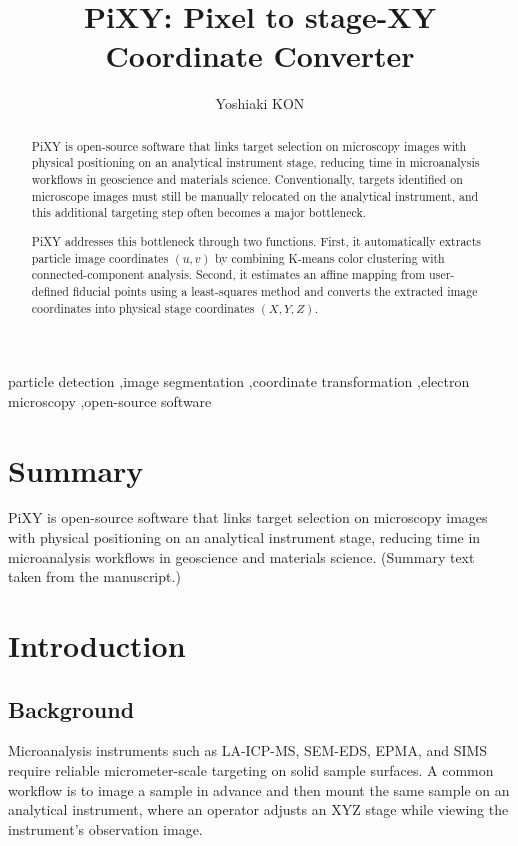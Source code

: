 \documentclass[preprint,12pt]{elsarticle}
\begin{document}
\begin{frontmatter}
\title{PiXY: Pixel to stage-XY Coordinate Converter}

\author[inst1]{Yoshiaki KON}
\address[inst1]{Geological Survey of Japan (GSJ), National Institute of Advanced Industrial Science and Technology (AIST)}

\begin{abstract}
PiXY is open-source software that links target selection on microscopy images with physical positioning on an analytical instrument stage, reducing time in microanalysis workflows in geoscience and materials science. Conventionally, targets identified on microscope images must still be manually relocated on the analytical instrument, and this additional targeting step often becomes a major bottleneck.

PiXY addresses this bottleneck through two functions. First, it automatically extracts particle image coordinates $(u, v)$ by combining K-means color clustering with connected-component analysis. Second, it estimates an affine mapping from user-defined fiducial points using a least-squares method and converts the extracted image coordinates into physical stage coordinates $(X, Y, Z)$.
\end{abstract}

\begin{keyword}
particle detection 
\sep image segmentation 
\sep coordinate transformation 
\sep electron microscopy 
\sep open-source software
\end{keyword}

\end{frontmatter}

\section*{Summary}
PiXY is open-source software that links target selection on microscopy images with physical positioning on an analytical instrument stage, reducing time in microanalysis workflows in geoscience and materials science. (Summary text taken from the manuscript.)

\section{Introduction}
\subsection{Background}
Microanalysis instruments such as LA-ICP-MS, SEM-EDS, EPMA, and SIMS require reliable micrometer-scale targeting on solid sample surfaces. A common workflow is to image a sample in advance and then mount the same sample on an analytical instrument, where an operator adjusts an XYZ stage while viewing the instrument’s observation image.
\end{document}
